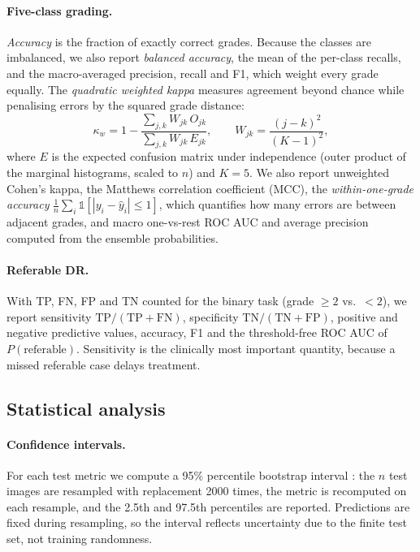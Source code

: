 \paragraph{Five-class grading.} \emph{Accuracy} is the fraction of exactly correct grades. Because the classes are
imbalanced, we also report \emph{balanced accuracy}, the mean of the per-class recalls, and the macro-averaged
precision, recall and F1, which weight every grade equally. The \emph{quadratic weighted kappa}
\citep{cohen1968weighted} measures agreement beyond chance while penalising errors by the squared grade distance:
\begin{equation}
\kappa_w = 1 - \frac{\sum_{j,k} W_{jk}\,O_{jk}}{\sum_{j,k} W_{jk}\,E_{jk}},\qquad
W_{jk} = \frac{(j-k)^2}{(K-1)^2},
\end{equation}
where $E$ is the expected confusion matrix under independence (outer product of the marginal histograms, scaled to
$n$) and $K=5$. We also report unweighted Cohen's kappa, the Matthews correlation coefficient (MCC), the
\emph{within-one-grade accuracy} $\frac1n\sum_i \mathbb{1}[|y_i-\hat y_i|\le1]$, which quantifies how many errors are
between adjacent grades, and macro one-vs-rest ROC AUC and average precision computed from the ensemble
probabilities.

\paragraph{Referable DR.} With TP, FN, FP and TN counted for the binary task (grade $\geq2$ vs.\ $<2$), we report
sensitivity $\mathrm{TP}/(\mathrm{TP}+\mathrm{FN})$, specificity $\mathrm{TN}/(\mathrm{TN}+\mathrm{FP})$, positive and
negative predictive values, accuracy, F1 and the threshold-free ROC AUC of $P(\text{referable})$. Sensitivity is the
clinically most important quantity, because a missed referable case delays treatment.

\subsection{Statistical analysis}
\paragraph{Confidence intervals.} For each test metric we compute a 95\% percentile bootstrap interval
\citep{efron1993introduction}: the $n$ test images are resampled with replacement 2000 times, the metric is recomputed
on each resample, and the 2.5th and 97.5th percentiles are reported. Predictions are fixed during resampling, so the
interval reflects uncertainty due to the finite test set, not training randomness.

